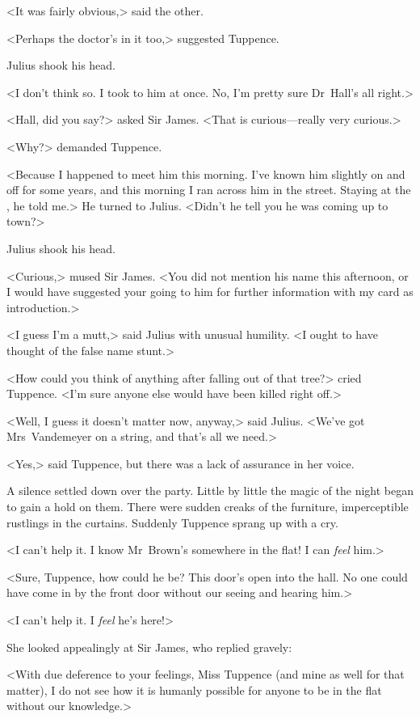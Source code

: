 <It was fairly obvious,> said the other.

<Perhaps the doctor's in it too,> suggested Tuppence.

Julius shook his head.

<I don't think so. I took to him at once. No, I'm pretty sure Dr~Hall's all right.>

<Hall, did you say?> asked Sir James. <That is curious—really very curious.>

<Why?> demanded Tuppence.

<Because I happened to meet him this morning. I've known him slightly on and off for some years, and this morning I ran across him in the street. Staying at the , he told me.> He turned to Julius. <Didn't he tell you he was coming up to town?>

Julius shook his head.

<Curious,> mused Sir James. <You did not mention his name this afternoon, or I would have suggested your going to him for further information with my card as introduction.>

<I guess I'm a mutt,> said Julius with unusual humility. <I ought to have thought of the false name stunt.>

<How could you think of anything after falling out of that tree?> cried Tuppence. <I'm sure anyone else would have been killed right off.>

<Well, I guess it doesn't matter now, anyway,> said Julius. <We've got Mrs~Vandemeyer on a string, and that's all we need.>

<Yes,> said Tuppence, but there was a lack of assurance in her voice.

A silence settled down over the party. Little by little the magic of the night began to gain a hold on them. There were sudden creaks of the furniture, imperceptible rustlings in the curtains. Suddenly Tuppence sprang up with a cry.

<I can't help it. I know Mr~Brown's somewhere in the flat! I can \emph{feel} him.>

<Sure, Tuppence, how could he be? This door's open into the hall. No one could have come in by the front door without our seeing and hearing him.>

<I can't help it. I \emph{feel} he's here!>

She looked appealingly at Sir James, who replied gravely:

<With due deference to your feelings, Miss Tuppence (and mine as well for that matter), I do not see how it is humanly possible for anyone to be in the flat without our knowledge.>

